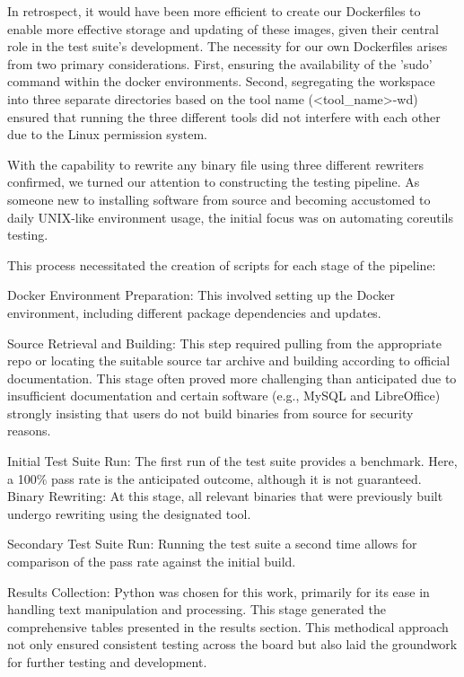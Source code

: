 \documentclass[a4paper,11pt,oneside]{report}
\begin{document}
In retrospect, it would have been more efficient to create our Dockerfiles to enable
more effective storage and updating of these images, given their central role in the test
suite's development. The necessity for our own Dockerfiles arises from two primary
considerations. First, ensuring the availability of the 'sudo' command within the docker
environments. Second, segregating the workspace into three separate directories based on
the tool name (\textless{}tool\_name\textgreater{}-wd) ensured that running the three different tools did not
interfere with each other due to the Linux permission system.

With the capability to rewrite any binary file using three different rewriters
confirmed, we turned our attention to constructing the testing pipeline. As someone new to
installing software from source and becoming accustomed to daily UNIX-like environment
usage, the initial focus was on automating coreutils testing.

This process necessitated the creation of scripts for each stage of the pipeline:

Docker Environment Preparation: This involved setting up the Docker environment,
including different package dependencies and updates.

Source Retrieval and Building: This step required pulling from the appropriate repo
or locating the suitable source tar archive and building according to official documentation.
This stage often proved more challenging than anticipated due to insufficient
documentation and certain software (e.g., MySQL and LibreOffice) strongly insisting that
users do not build binaries from source for security reasons.

Initial Test Suite Run: The first run of the test suite provides a benchmark. Here, a
100\% pass rate is the anticipated outcome, although it is not guaranteed.
Binary Rewriting: At this stage, all relevant binaries that were previously built
undergo rewriting using the designated tool.

Secondary Test Suite Run: Running the test suite a second time allows for
comparison of the pass rate against the initial build.

Results Collection: Python was chosen for this work, primarily for its ease in handling
text manipulation and processing. This stage generated the comprehensive tables presented
in the results section.
This methodical approach not only ensured consistent testing across the board but
also laid the groundwork for further testing and development.
\end{document}
